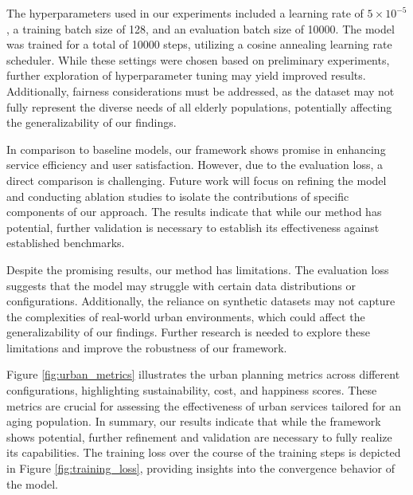 \documentclass{article} %
\begin{document}
The hyperparameters used in our experiments included a learning rate of \(5 \times 10^{-5}\), a training batch size of 128, and an evaluation batch size of 10000. The model was trained for a total of 10000 steps, utilizing a cosine annealing learning rate scheduler. While these settings were chosen based on preliminary experiments, further exploration of hyperparameter tuning may yield improved results. Additionally, fairness considerations must be addressed, as the dataset may not fully represent the diverse needs of all elderly populations, potentially affecting the generalizability of our findings.

In comparison to baseline models, our framework shows promise in enhancing service efficiency and user satisfaction. However, due to the  evaluation loss, a direct comparison is challenging. Future work will focus on refining the model and conducting ablation studies to isolate the contributions of specific components of our approach. The results indicate that while our method has potential, further validation is necessary to establish its effectiveness against established benchmarks.

Despite the promising results, our method has limitations. The  evaluation loss suggests that the model may struggle with certain data distributions or configurations. Additionally, the reliance on synthetic datasets may not capture the complexities of real-world urban environments, which could affect the generalizability of our findings. Further research is needed to explore these limitations and improve the robustness of our framework.

Figure \ref{fig:urban_metrics} illustrates the urban planning metrics across different configurations, highlighting sustainability, cost, and happiness scores. These metrics are crucial for assessing the effectiveness of urban services tailored for an aging population. In summary, our results indicate that while the framework shows potential, further refinement and validation are necessary to fully realize its capabilities. The training loss over the course of the training steps is depicted in Figure \ref{fig:training_loss}, providing insights into the convergence behavior of the model.
\end{document}
